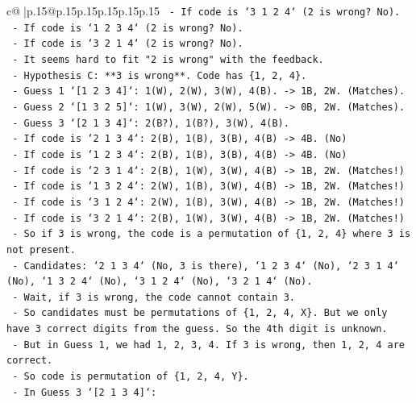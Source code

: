 \documentclass{article}
\begin{document}
{\begin{supertabular}{c@{$\;$}|p{.15\linewidth}@{}p{.15\linewidth}p{.15\linewidth}p{.15\linewidth}p{.15\linewidth}p{.15\linewidth}}
{{{\texttt{        {-} If code is `3 1 2 4` (2 is wrong? No).} \\
\texttt{        {-} If code is `1 2 3 4` (2 is wrong? No).} \\
\texttt{        {-} If code is `3 2 1 4` (2 is wrong? No).} \\
\texttt{        {-} It seems hard to fit "2 is wrong" with the feedback.} \\
\texttt{    {-} Hypothesis C: **3 is wrong**. Code has \{1, 2, 4\}.} \\
\texttt{      {-} Guess 1 `{[}1 2 3 4{]}`: 1(W), 2(W), 3(W), 4(B). {-}> 1B, 2W. (Matches).} \\
\texttt{      {-} Guess 2 `{[}1 3 2 5{]}`: 1(W), 3(W), 2(W), 5(W). {-}> 0B, 2W. (Matches).} \\
\texttt{      {-} Guess 3 `{[}2 1 3 4{]}`: 2(B?), 1(B?), 3(W), 4(B).} \\
\texttt{        {-} If code is `2 1 3 4`: 2(B), 1(B), 3(B), 4(B) {-}> 4B. (No)} \\
\texttt{        {-} If code is `1 2 3 4`: 2(B), 1(B), 3(B), 4(B) {-}> 4B. (No)} \\
\texttt{        {-} If code is `2 3 1 4`: 2(B), 1(W), 3(W), 4(B) {-}> 1B, 2W. (Matches!)} \\
\texttt{        {-} If code is `1 3 2 4`: 2(W), 1(B), 3(W), 4(B) {-}> 1B, 2W. (Matches!)} \\
\texttt{        {-} If code is `3 1 2 4`: 2(W), 1(B), 3(W), 4(B) {-}> 1B, 2W. (Matches!)} \\
\texttt{        {-} If code is `3 2 1 4`: 2(B), 1(W), 3(W), 4(B) {-}> 1B, 2W. (Matches!)} \\
\texttt{      {-} So if 3 is wrong, the code is a permutation of \{1, 2, 4\} where 3 is not present.} \\
\texttt{      {-} Candidates: `2 1 3 4` (No, 3 is there), `1 2 3 4` (No), `2 3 1 4` (No), `1 3 2 4` (No), `3 1 2 4` (No), `3 2 1 4` (No).} \\
\texttt{      {-} Wait, if 3 is wrong, the code cannot contain 3.} \\
\texttt{      {-} So candidates must be permutations of \{1, 2, 4, X\}. But we only have 3 correct digits from the guess. So the 4th digit is unknown.} \\
\texttt{      {-} But in Guess 1, we had 1, 2, 3, 4. If 3 is wrong, then 1, 2, 4 are correct.} \\
\texttt{      {-} So code is permutation of \{1, 2, 4, Y\}.} \\
\texttt{      {-} In Guess 3 `{[}2 1 3 4{]}`:} \\
}}}
\end{supertabular}}
\end{document}
